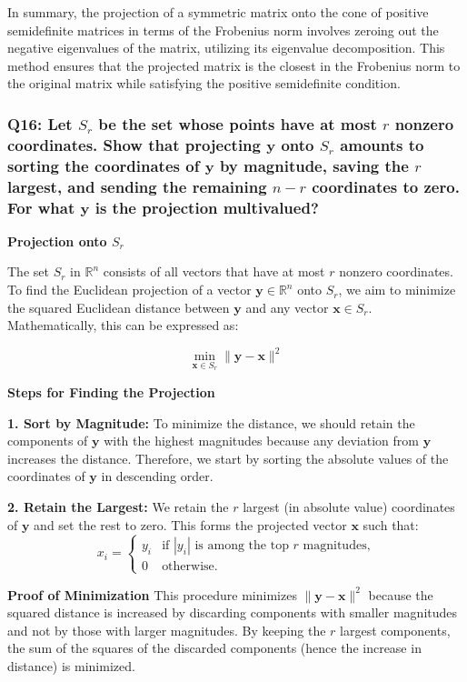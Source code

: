 \documentclass[8pt]{article}
\begin{document}
In summary, the projection of a symmetric matrix onto the cone of positive semidefinite matrices in terms of the Frobenius norm involves zeroing out the negative eigenvalues of the matrix, utilizing its eigenvalue decomposition. This method ensures that the projected matrix is the closest in the Frobenius norm to the original matrix while satisfying the positive semidefinite condition.

\subsubsection*{Q16: Let \(S_r\) be the set whose points have at most \(r\) nonzero coordinates. Show that projecting \(\mathbf{y}\) onto \(S_r\) amounts to sorting the coordinates of \(\mathbf{y}\) by magnitude, saving the \(r\) largest, and sending the remaining \(n - r\) coordinates to zero. For what \(\mathbf{y}\) is the projection multivalued?}

\textbf{Projection onto \(S_r\)}

The set \(S_r\) in \(\mathbb{R}^n\) consists of all vectors that have at most \(r\) nonzero coordinates. To find the Euclidean projection of a vector \(\mathbf{y} \in \mathbb{R}^n\) onto \(S_r\), we aim to minimize the squared Euclidean distance between \(\mathbf{y}\) and any vector \(\mathbf{x} \in S_r\). Mathematically, this can be expressed as:

\[
\min_{\mathbf{x} \in S_r} \|\mathbf{y} - \mathbf{x}\|^2
\]

\textbf{Steps for Finding the Projection}

\textbf{1. Sort by Magnitude:}
   To minimize the distance, we should retain the components of \(\mathbf{y}\) with the highest magnitudes because any deviation from \(\mathbf{y}\) increases the distance. Therefore, we start by sorting the absolute values of the coordinates of \(\mathbf{y}\) in descending order.

\textbf{2. Retain the Largest:}
   We retain the \(r\) largest (in absolute value) coordinates of \(\mathbf{y}\) and set the rest to zero. This forms the projected vector \(\mathbf{x}\) such that:
   \[
   x_i = 
   \begin{cases} 
   y_i & \text{if } |y_i| \text{ is among the top } r \text{ magnitudes,} \\
   0 & \text{otherwise.}
   \end{cases}
   \]

\textbf{Proof of Minimization}
This procedure minimizes \(\|\mathbf{y} - \mathbf{x}\|^2\) because the squared distance is increased by discarding components with smaller magnitudes and not by those with larger magnitudes. By keeping the \(r\) largest components, the sum of the squares of the discarded components (hence the increase in distance) is minimized.
\end{document}
